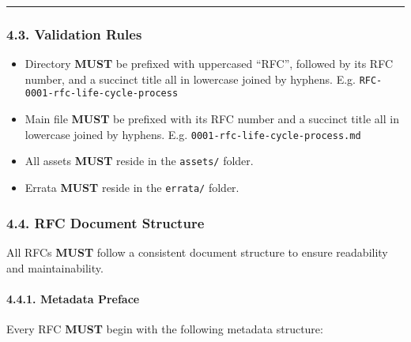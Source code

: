 \begin{Shaded}
\begin{Highlighting}[]
\end{Highlighting}
\end{Shaded}

\begin{center}\rule{0.5\linewidth}{0.5pt}\end{center}

\subsubsection{4.3. Validation Rules}\label{validation-rules}

\begin{itemize}
\tightlist
\item
  Directory \textbf{MUST} be prefixed with uppercased ``RFC'', followed
  by its RFC number, and a succinct title all in lowercase joined by
  hyphens. E.g. \texttt{RFC-0001-rfc-life-cycle-process}
\item
  Main file \textbf{MUST} be prefixed with its RFC number and a succinct
  title all in lowercase joined by hyphens. E.g.
  \texttt{0001-rfc-life-cycle-process.md}
\item
  All assets \textbf{MUST} reside in the \texttt{assets/} folder.
\item
  Errata \textbf{MUST} reside in the \texttt{errata/} folder.
\end{itemize}

\subsubsection{4.4. RFC Document
Structure}\label{rfc-document-structure}

All RFCs \textbf{MUST} follow a consistent document structure to ensure
readability and maintainability.

\paragraph{4.4.1. Metadata Preface}\label{metadata-preface}

Every RFC \textbf{MUST} begin with the following metadata structure:

